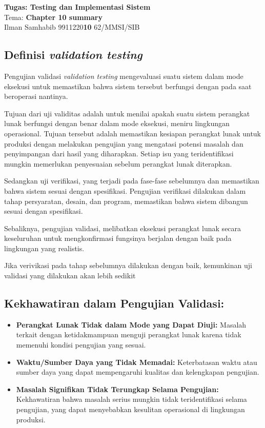 \documentclass[12pt]{article}
\begin{document}
\begin{center}
   \textbf{Tugas: Testing dan Implementasi Sistem}
   \\ Tema: \textbf{Chapter 10 summary}
   \\Ilman Samhabib 9911220\textbf{10} 62/MMSI/SIB

\end{center}


\subsection*{Definisi \emph{validation testing} }

Pengujian validasi \emph{validation testing} mengevaluasi suatu sistem dalam mode eksekusi untuk memastikan bahwa sistem tersebut berfungsi dengan pada saat beroperasi nantinya.

Tujuan dari uji validitas adalah untuk menilai apakah suatu sistem perangkat lunak berfungsi dengan benar dalam mode eksekusi, meniru lingkungan operasional. Tujuan tersebut adalah memastikan kesiapan perangkat lunak untuk produksi dengan melakukan pengujian yang mengatasi potensi masalah dan penyimpangan dari hasil yang diharapkan. Setiap isu yang teridentifikasi mungkin memerlukan penyesuaian sebelum perangkat lunak diterapkan.


Sedangkan uji verifikasi, yang terjadi pada fase-fase sebelumnya dan memastikan bahwa sistem sesuai dengan spesifikasi. Pengujian verifikasi dilakukan dalam tahap persyaratan, desain, dan program, memastikan bahwa sistem dibangun sesuai dengan spesifikasi.

Sebaliknya,
pengujian validasi,
melibatkan eksekusi perangkat lunak secara keseluruhan untuk mengkonfirmasi fungsinya berjalan dengan baik pada lingkungan yang realistis.

Jika verivikasi pada tahap sebelumnya dilakukan dengan baik, kemunkinan uji validasi yang dilakukan akan lebih sedikit

\subsection*{Kekhawatiran dalam Pengujian Validasi:}
\begin{itemize}
   \item   \textbf{Perangkat Lunak Tidak dalam Mode yang Dapat Diuji:}
         Masalah terkait dengan ketidakmampuan menguji perangkat lunak karena tidak memenuhi kondisi pengujian yang sesuai.
   \item \textbf{Waktu/Sumber Daya yang Tidak Memadai:}
         Keterbatasan waktu atau sumber daya yang dapat mempengaruhi kualitas dan kelengkapan pengujian.
   \item  \textbf{Masalah Signifikan Tidak Terungkap Selama Pengujian:}
         Kekhawatiran bahwa masalah serius mungkin tidak teridentifikasi selama pengujian, yang dapat menyebabkan kesulitan operasional di lingkungan produksi.
\end{itemize}
\end{document}
